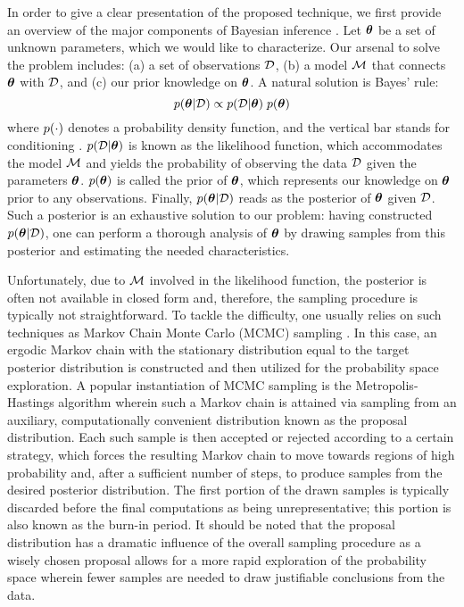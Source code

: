 In order to give a clear presentation of the proposed technique, we first provide an overview of the major components of Bayesian inference \cite{gelman2004}.
Let ${\boldsymbol\theta}$ be a set of unknown parameters, which we would like to characterize. Our arsenal to solve the problem includes: (a) a set of observations $\mathcal{D}$, (b) a model $\model$ that connects ${\boldsymbol\theta}$ with $\mathcal{D}$, and (c) our prior knowledge on ${\boldsymbol\theta}$. A natural solution is Bayes' rule:
\begin{equation} \elabel{bayes}
  \f{\vparam | \Data} \propto \f{\Data | \vparam} \; \f{\vparam}
\end{equation}
where $\f{\cdot}$ denotes a probability density function, and the vertical bar stands for conditioning \cite{durrett2010}.
$\f{\Data | \vparam}$ is known as the likelihood function, which accommodates the model $\model$ and yields the probability of observing the data $\mathcal{D}$ given the parameters ${\boldsymbol\theta}$.
$\f{\vparam}$ is called the prior of ${\boldsymbol\theta}$, which represents our knowledge on ${\boldsymbol\theta}$ prior to any observations.
Finally, $\f{\vparam | \Data}$ reads as the posterior of ${\boldsymbol\theta}$ given $\mathcal{D}$. Such a posterior is an exhaustive solution to our problem: having constructed $\f{\vparam | \Data}$, one can perform a thorough analysis of ${\boldsymbol\theta}$ by drawing samples from this posterior and estimating the needed characteristics.

Unfortunately, due to $\model$ involved in the likelihood function, the posterior is often not available in closed form and, therefore, the sampling procedure is typically not straightforward.
To tackle the difficulty, one usually relies on such techniques as Markov Chain Monte Carlo (MCMC) sampling \cite{gelman2004}. In this case, an ergodic Markov chain with the stationary distribution equal to the target posterior distribution is constructed and then utilized for the probability space exploration.
A popular instantiation of MCMC sampling is the Metropolis-Hastings algorithm wherein such a Markov chain is attained via sampling from an auxiliary, computationally convenient distribution known as the proposal distribution.
Each such sample is then accepted or rejected according to a certain strategy, which forces the resulting Markov chain to move towards regions of high probability and, after a sufficient number of steps, to produce samples from the desired posterior distribution.
The first portion of the drawn samples is typically discarded before the final computations as being unrepresentative; this portion is also known as the burn-in period.
It should be noted that the proposal distribution has a dramatic influence of the overall sampling procedure as a wisely chosen proposal allows for a more rapid exploration of the probability space wherein fewer samples are needed to draw justifiable conclusions from the data.
